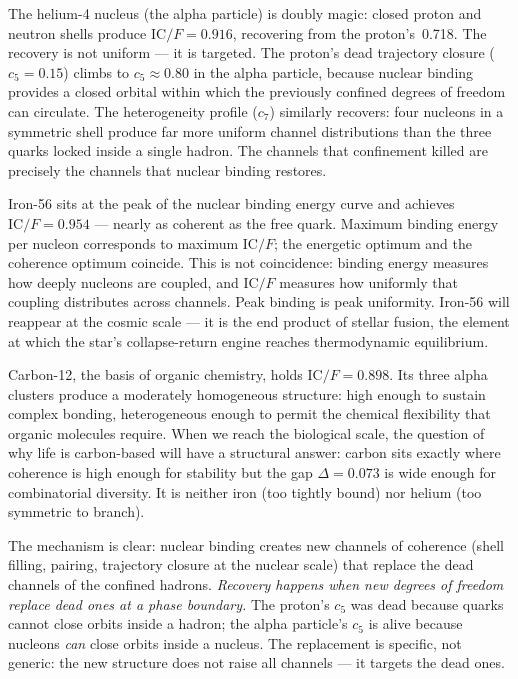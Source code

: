 \documentclass[
  aps,
  prd,
  twocolumn,
  superscriptaddress,
  nofootinbib,
  floatfix
]{revtex4-2}
\newcommand{\IC}{\mathrm{IC}}
\begin{document}
The helium-4 nucleus (the alpha particle) is doubly magic:
closed proton and neutron shells produce $\IC/F = 0.916$,
recovering from the proton's~0.718.  The recovery is not
uniform --- it is targeted.  The proton's dead trajectory
closure ($c_5 = 0.15$) climbs to $c_5 \approx 0.80$ in the
alpha particle, because nuclear binding provides a closed
orbital within which the previously confined degrees of
freedom can circulate.  The heterogeneity profile ($c_7$)
similarly recovers: four nucleons in a symmetric shell
produce far more uniform channel distributions than the
three quarks locked inside a single hadron.  The channels
that confinement killed are precisely the channels that
nuclear binding restores.

Iron-56 sits at the peak of the nuclear binding energy
curve and achieves $\IC/F = 0.954$ --- nearly as coherent
as the free quark.   Maximum binding energy per nucleon
corresponds to maximum $\IC/F$; the energetic optimum and
the coherence optimum coincide.  This is not coincidence:
binding energy measures how deeply nucleons are
coupled, and $\IC/F$ measures how uniformly that coupling
distributes across channels.  Peak binding is peak
uniformity.  Iron-56 will reappear at the cosmic scale ---
it is the end product of stellar fusion, the element at
which the star's collapse-return engine reaches
thermodynamic equilibrium.

Carbon-12, the basis of organic chemistry, holds
$\IC/F = 0.898$.  Its three alpha clusters produce a
moderately homogeneous structure: high enough to sustain
complex bonding, heterogeneous enough to permit the
chemical flexibility that organic molecules require.
When we reach the biological scale, the question of why
life is carbon-based will have a structural answer:
carbon sits exactly where coherence is high enough for
stability but the gap $\Delta = 0.073$ is wide enough
for combinatorial diversity.  It is neither iron (too
tightly bound) nor helium (too symmetric to branch).

The mechanism is clear: nuclear binding creates new channels
of coherence (shell filling, pairing, trajectory closure at
the nuclear scale) that replace the dead channels of the
confined hadrons.  \emph{Recovery happens when new degrees of
freedom replace dead ones at a phase boundary.}  The proton's
$c_5$ was dead because quarks cannot close orbits inside a
hadron; the alpha particle's $c_5$ is alive because nucleons
\emph{can} close orbits inside a nucleus.  The replacement
is specific, not generic: the new structure does not raise
all channels --- it targets the dead ones.
\end{document}
